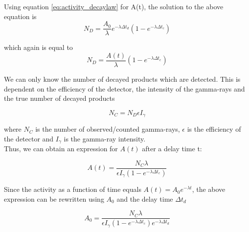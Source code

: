 Using equation \ref{eq:activity_decaylaw} for A(t), the solution to the above equation is 
\begin{equation} \label{eq:numb_of_decayed}
    N_D= \frac{A_0}{\lambda}e^{-\lambda \Delta t_d}(1-e^{-\lambda \Delta t_c})
\end{equation}

which again is equal to
\begin{equation}
    N_D = \frac{A(t)}{\lambda} (1-e^{-\lambda \Delta t_c})
\end{equation}

We can only know the number of decayed products which are detected. This is dependent on the efficiency of the detector, the intensity of the gamma-rays and the true number of decayed products

\begin{equation}\label{eq:Ngamma}
    N_C  = N_D \epsilon I_\gamma
\end{equation}

where $N_C$ is the number of observed/counted gamma-rays, $\epsilon$ is the efficiency of the detector and $I_\gamma$ is the gamma-ray intensity.\\ 

\noindent
Thus, we can obtain an expression for $A(t)$ after a delay time t: 

\begin{equation} \label{eq:Final_Expression_A}
    A(t) = \frac{N_C \lambda}{\epsilon I_\gamma (1-e^{-\lambda \Delta t_c})}
\end{equation}

\noindent 
Since the activity as a function of time equals $A(t)=A_0e^{-\lambda t}$, the above expression can be rewritten using $A_0$ and the delay time $\Delta t_d$

\begin{equation} \label{eq:Final_Expression_A0}
    A_0 = \frac{N_C \lambda }{\epsilon I_\gamma (1-e^{-\lambda \Delta t_c})e^{-\lambda \Delta t_d}}
\end{equation}





